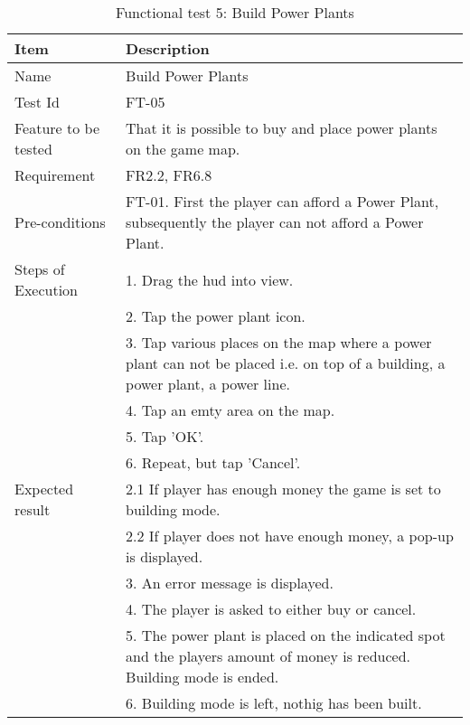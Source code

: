 \begin{table}[H]
\centering
	\begin{tabular}{ l | p{8cm} }
		\hline
		\rowcolor{lightgray}
		{\bf Item} & {\bf Description} \\ \hline
		Name & Build Power Plants \\ 
		Test Id & FT-05 \\ 
		Feature to be tested & That it is possible to buy and place power plants on the game map. \\ 
		Requirement & FR2.2, FR6.8 \\ 
		Pre-conditions & FT-01. First the player can afford a Power Plant, subsequently the player can not afford a Power Plant. \\
		Steps of Execution & 1. Drag the hud into view. \\ 
		& 2. Tap the power plant icon. \\
		& 3. Tap various places on the map where a power plant can not be placed i.e. on top of a building, a power plant, a power line. \\
		& 4. Tap an emty area on the map. \\
		& 5. Tap 'OK'. \\
		& 6. Repeat, but tap 'Cancel'. \\
		Expected result & 2.1 If player has enough money the game is set to building mode. \\
		& 2.2 If player does not have enough money, a pop-up is displayed. \\
		& 3. An error message is displayed. \\
		& 4. The player is asked to either buy or cancel. \\
		& 5. The power plant is placed on the indicated spot and the players amount of money is reduced. Building mode is ended. \\
		& 6. Building mode is left, nothig has been built. \\
		\hline
	\end{tabular}
	\caption{Functional test 5: Build Power Plants}
\end{table}

